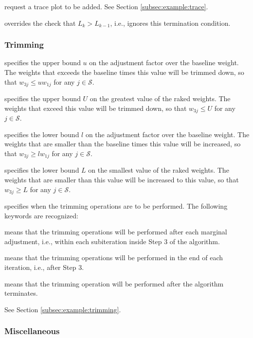 \hangpara
{} request a trace plot to be added. See
Section \ref{subsec:example:trace}.

\hangpara
{} overrides the check
that $L_k > L_{k-1}$, i.e., ignores this termination condition.

\subsubsection{Trimming}

\hangpara
{} specifies the upper bound $u$ on the adjustment 
    factor over the baseline weight. The weights
    that exceeds the baseline times this value will be trimmed down,
    so that $w_{3j} \le u w_{1j}$ for any $j\in\mathcal{S}$.

\hangpara
{} specifies the upper bound $U$ on the greatest 
    value of the raked weights.  The weights that
    exceed this value will be trimmed down, so that
    $w_{3j} \le U$ for any $j\in\mathcal{S}$.

\hangpara
{} specifies the lower bound $l$ on the adjustment factor 
    over the baseline weight.  The weights that are smaller than the baseline 
    times this value will be increased, so that
    $w_{3j} \ge l w_{1j}$ for any $j\in\mathcal{S}$.

\hangpara
{} specifies the lower bound $L$ on the smallest value 
    of the raked weights.  The weights that are smaller than this value will 
    be increased to this value, so that 
    $w_{3j} \ge L$ for any $j\in\mathcal{S}$.

\hangpara
{} specifies when the trimming operations 
    are to be performed. The following keywords are recognized:

\morehang {} means that the trimming operations will be performed 
    after each marginal adjustment, i.e., within each subiteration inside 
    Step 3 of the algorithm.

\morehang {} means that the trimming operations will be performed 
    in the end of each iteration, i.e., after Step 3.

\morehang {}
means that the trimming operation will be performed after the algorithm terminates.

See Section \ref{subsec:example:trimming}.

\subsubsection{Miscellaneous}

